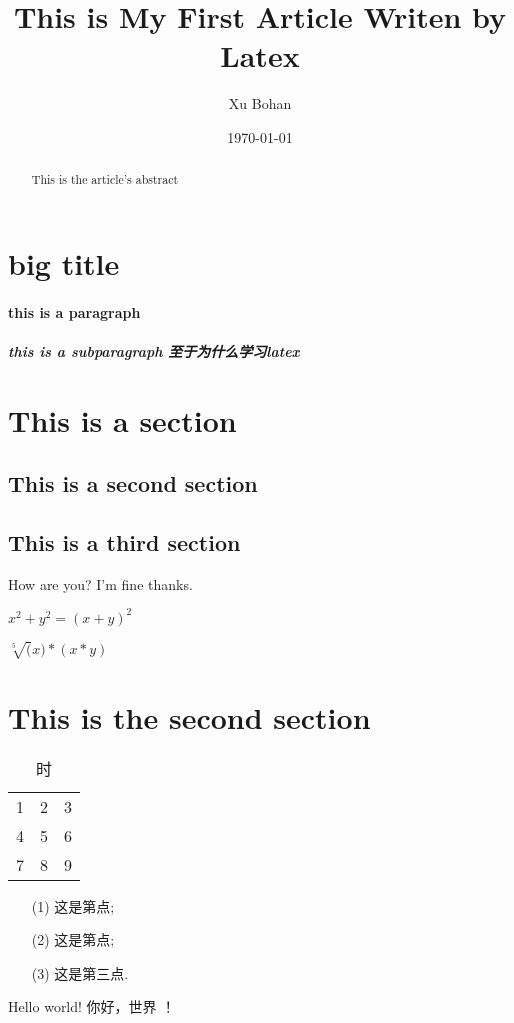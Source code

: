 \documentclass[a4paper]{article}
\title{This is My First Article Writen by Latex}
\author{Xu Bohan}
\date{\today}
\begin{document}
    \maketitle

    \begin{abstract}
        This is the article's abstract
    \end{abstract}

    \tableofcontents
    \newpage


    \section{big title}\label{sec:big-title}

    \paragraph{this is a paragraph}

    \subparagraph{this is a subparagraph 至于为什么学习latex}


    \section{This is a section}\label{sec:this-is-a-section}

    \subsection{This is a second section}\label{subsec:this-is-a-second-section}
    \subsection[short]{This is a third section}\label{subsec:this-is-a-third-section}
    How are you?
    I'm fine thanks.

    $x^2+y^2 = (x+y)^2$

    $\sqrt[5](x)*(x*y)$


    \section{This is the second section}\label{sec:this-is-the-second-section}
    \begin{table}[htbp]
        \centering
        \begin{tabular}{ccc}
            1 & 2 & 3 \\
            4 & 5 & 6 \\
            7 & 8 & 9
        \end{tabular}\label{tab:table}
        \caption{时}
    \end{table}

    \begin{enumerate}
        \item[(1)] 这是第点;
        \item[(2)] 这是第点;
        \item[(3)] 这是第三点.
    \end{enumerate}

    Hello world!
    你好，世界 ！
\end{document}
